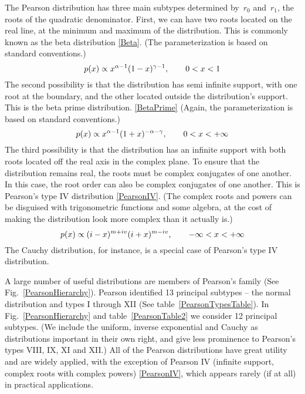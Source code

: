 The Pearson distribution has three main subtypes determined by~$r_0$ and~$r_1$, the roots of the quadratic denominator. First, we can have two roots located on the real line, at the minimum and maximum of the distribution. This is commonly known as the beta distribution \eqref{Beta}. (The parameterization is based on standard conventions.)
\[
p(x) \propto x^{\alpha-1} (1-x)^{\gamma-1}, \qquad 0<x<1 
\notag
\]
The second possibility is that the distribution has semi infinite support, with one root at the boundary, and the other located outside the distribution's support. This is the beta prime distribution.  \eqref{BetaPrime} (Again, the parameterization is based on standard conventions.)
\[
p(x) \propto x^{\alpha-1} (1+x)^{-\alpha-\gamma}, \qquad 0<x<+\infty
\notag
\checked
\]
The third possibility is that the distribution has an infinite support with both roots located off the real axis in the complex plane.  To ensure that the distribution remains real, the roots must be complex conjugates of one another. In this case, the root order can also be complex conjugates of one another. This is Pearson's type IV distribution \eqref{PearsonIV}. (The complex roots and powers can be disguised with trigonometric functions and some algebra, at the cost of making the distribution look more complex than it actually is.)
\[
p(x) \propto (i-x)^{m+iv} (i+x)^{m-iv}, \qquad -\infty <x<+ \infty 
\]
The Cauchy distribution, for instance, is a special case of Pearson's type IV distribution.





A large number of useful distributions are members of Pearson's family (See Fig.~\ref{PearsonHierarchy}). Pearson identified 13 principal subtypes -- the normal distribution and types I through XII (See table~\ref{PearsonTypesTable}). 
In Fig.~\ref{PearsonHierarchy} and table~\ref{PearsonTable2} we consider 12 principal subtypes. (We include the uniform, inverse exponential and Cauchy as distributions important in their own right, and give less prominence to Pearson's types VIII, IX, XI and XII.)
All of the Pearson distributions have great utility and are widely applied, with the exception of Pearson IV (infinite support, complex roots with complex powers) \eqref{PearsonIV}, which appears rarely (if at all) in practical applications. 

